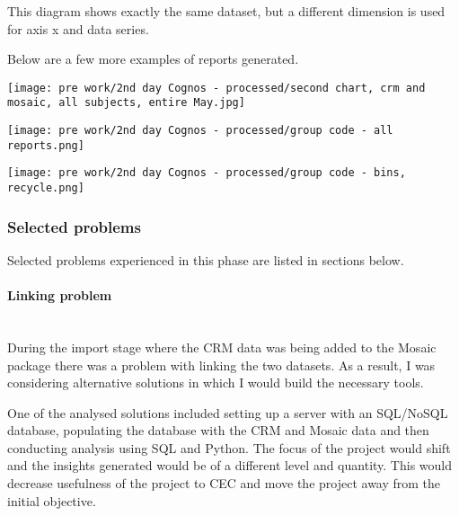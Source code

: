 This diagram shows exactly the same dataset, but a different dimension is used for axis x and data series.

Below are a few more examples of reports generated.


\begin{center}
  \texttt{[image: pre work/2nd day Cognos - processed/second chart, crm and mosaic, all subjects, entire May.jpg]}
  \label{normal_case}
\end{center}


\begin{center}
  \texttt{[image: pre work/2nd day Cognos - processed/group code - all reports.png]}
  \label{normal_case}
\end{center}



\begin{center}
  \texttt{[image: pre work/2nd day Cognos - processed/group code - bins, recycle.png]}
  \label{normal_case}
\end{center}



			\subsubsection{Selected problems}
			
Selected problems experienced in this phase are listed in sections below.			
			
				\paragraph{Linking problem}\mbox{}\\
During the import stage where the CRM data was being added to the Mosaic package there was a problem with linking the two datasets. As a result, I was considering alternative solutions in which I would build the necessary tools.

One of the analysed solutions included setting up a server with an SQL/NoSQL database, populating the database with the CRM and Mosaic data and then conducting analysis using SQL and Python. The focus of the project would shift and the insights generated would be of a different level and quantity. This would decrease usefulness of the project to CEC and move the project away from the initial objective.

